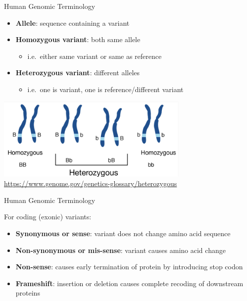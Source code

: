 \documentclass[
  ignorenonframetext,
]{beamer}
\providecommand{\tightlist}{%
  \setlength{\itemsep}{0pt}\setlength{\parskip}{0pt}}
\begin{document}
\begin{frame}{Human Genomic Terminology}
\label{human-genomic-terminology}
\Large

\begin{itemize}
\tightlist
\item
  \textbf{Allele}: sequence containing a variant
\item
  \textbf{Homozygous variant}: both same allele

  \begin{itemize}
  \tightlist
  \item
    i.e.~either same variant or same as reference
  \end{itemize}
\item
  \textbf{Heterozygous variant}: different alleles

  \begin{itemize}
  \tightlist
  \item
    i.e.~one is variant, one is reference/different variant
  \end{itemize}
\end{itemize}

\center

\includegraphics[width=0.7\textwidth,height=\textheight]{figs/human_genomic.png}
\url{https://www.genome.gov/genetics-glossary/heterozygous}
\end{frame}

\begin{frame}{Human Genomic Terminology}
\label{human-genomic-terminology-1}
\Large

For coding (exonic) variants:

\begin{itemize}
\tightlist
\item
  \textbf{Synonymous or sense}: variant does not change amino acid
  sequence
\item
  \textbf{Non-synonymous or mis-sense}: variant causes amino acid change
\item
  \textbf{Non-sense}: causes early termination of protein by introducing
  stop codon
\item
  \textbf{Frameshift}: insertion or deletion causes complete recoding of
  downstream proteins
\end{itemize}
\end{frame}
\end{document}

